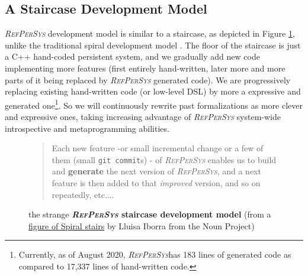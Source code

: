 \documentclass{IEEEtran}
\newcommand{\RefPerSys}{{\textit{\textsc{RefPerSys}}}}
\begin{document}
 

\subsection{A Staircase Development Model}
\label{subsec:staircase}
{\RefPerSys} development model is similar to a staircase, as depicted
in Figure \ref{fig:bootstrap-stair}, unlike the traditional spiral development
model \cite{boehm:1988:spiral}. The
floor of the staircase is just a C++ hand-coded persistent
system, and we gradually add new code implementing more features
(first entirely hand-written, later more and more parts of it being replaced
by {\RefPerSys} generated code). We are progressively replacing
existing hand-written code (or low-level DSL) by more a expressive and
generated one\footnote{Currently, as of August 2020, \RefPerSys has 183 lines of generated code as
compared to 17,337 lines of hand-written code.}. So we will continuously rewrite past
formalizations as more clever and expressive ones, taking increasing advantage of
{\RefPerSys} %
system-wide introspective and metaprogramming abilities.


\begin{figure}[h]
  \begin{center}
    
  \end{center}

  \begin{quote}
    Each new feature -or small incremental change or a few of them
    (small \texttt{git commit}s) - of {\RefPerSys} enables us to build
    and \textbf{generate} the next version of {\RefPerSys}, and a next
    feature is then added to that \textit{improved} version, and so on
    repeatedly, etc....
  \end{quote}
  
  \caption{the strange \textbf{{\RefPerSys} staircase development model} 
	(from a \href{https://thenounproject.com/term/spiral-stairs/956427/}
	{figure of Spiral stairs} by Lluisa Iborra from the Noun Project)}
  \label{fig:bootstrap-stair}
\end{figure}
\end{document}
